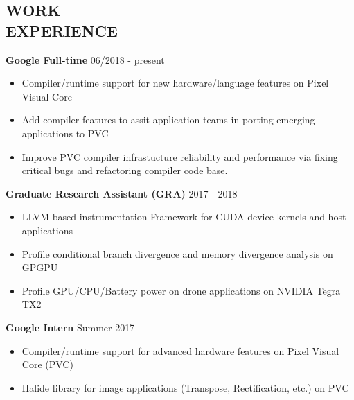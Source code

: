 \documentclass[margin, 9pt]{res} %
\begin{document}
\begin{resume}

\section{WORK\\ EXPERIENCE}

{\textbf{Google Full-time}} \hfill{06/2018 - present}\\
\vspace*{-10pt}
\begin{itemize}[leftmargin=*] \itemsep -3pt
\vspace*{-5pt}
	\item Compiler/runtime support for new hardware/language features on Pixel Visual Core
	\item Add compiler features to assit application teams in porting emerging applications to PVC
	\item Improve PVC compiler infrastucture reliability and performance via fixing critical bugs and refactoring compiler code base.
\end{itemize} 

\medskip
{\textbf{Graduate Research Assistant (GRA)}} \hfill{2017 - 2018}\\
\vspace*{-10pt}
\begin{itemize}[leftmargin=*] \itemsep -3pt
\vspace*{-5pt}
	\item LLVM based instrumentation Framework for CUDA device kernels and host applications
	\item Profile conditional branch divergence and memory divergence analysis on GPGPU
	\item Profile GPU/CPU/Battery power on drone applications on NVIDIA Tegra TX2
\end{itemize}

\medskip
{\textbf{Google Intern}} \hfill{Summer 2017}\\
\vspace*{-10pt}
\begin{itemize}[leftmargin=*] \itemsep -3pt
\vspace*{-5pt}
	\item Compiler/runtime support for advanced hardware features on Pixel Visual Core (PVC)
	\item Halide library for image applications (Transpose, Rectification, etc.) on PVC
\end{itemize}
 

\end{resume}
\end{document}
